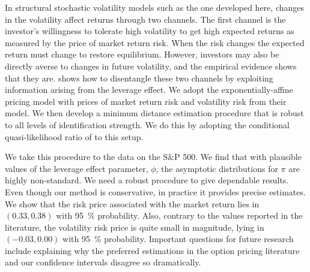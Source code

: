 \documentclass[11pt, letterpaper, twoside]{article}
\begin{document}
In structural stochastic volatility models such as the one developed here, changes in the volatility affect returns through two channels.  The first channel is the investor's willingness to tolerate high volatility to get high expected returns as measured by the price of market return risk. When the risk changes the expected return must change to restore equilibrium. However, investors may also be directly averse to changes in future volatility, and the empirical evidence shows that they are. \Textcite{han2018leverage} shows how to disentangle these two channels by exploiting information arising from the leverage effect. We adopt the exponentially-affine pricing model with prices of market return risk and volatility risk from their model. We then develop a minimum distance estimation procedure that is robust to all levels of identification strength. We do this by adopting the conditional quasi-likelihood ratio of \textcite{andrews2016conditional} to this setup. 

We take this procedure to the data on the S\&P 500. We find that with plausible values of the leverage effect parameter, $\phi$, the asymptotic distributions for $\pi$ are highly non-standard. We need a robust procedure to give dependable results. Even though our method is conservative, in practice it provides precise estimates. We show that the risk price associated with the market return lies in $(0.33, 0.38)$ with \SI{95}{\percent} probability. Also, contrary to the values reported in the literature, the volatility risk price is quite small in magnitude, lying in $(-0.03, 0.00)$ with \SI{95}{\percent} probability. Important questions for future research include explaining why the preferred estimations in the option pricing literature and our confidence intervals disagree so dramatically.




\printbibliography
\clearpage
\end{document}
